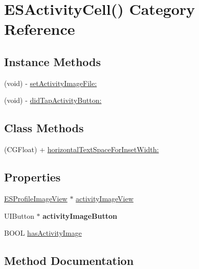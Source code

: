 \hypertarget{category_e_s_activity_cell_07_08}{}\section{E\+S\+Activity\+Cell() Category Reference}
\label{category_e_s_activity_cell_07_08}
\subsection*{Instance Methods}
\begin{DoxyCompactItemize}
\item 
(void) -\/ \hyperlink{category_e_s_activity_cell_07_08_a9d821c59ae22ed2b1169df73f4623a1c}{set\+Activity\+Image\+File\+:}
\item 
(void) -\/ \hyperlink{category_e_s_activity_cell_07_08_ae04968926ffa013fb910647318fad0e9}{did\+Tap\+Activity\+Button\+:}
\end{DoxyCompactItemize}
\subsection*{Class Methods}
\begin{DoxyCompactItemize}
\item 
(C\+G\+Float) + \hyperlink{category_e_s_activity_cell_07_08_a14798b38d97de55b3f61590bf993f941}{horizontal\+Text\+Space\+For\+Inset\+Width\+:}
\end{DoxyCompactItemize}
\subsection*{Properties}
\begin{DoxyCompactItemize}
\item 
\hyperlink{interface_e_s_profile_image_view}{E\+S\+Profile\+Image\+View} $\ast$ \hyperlink{category_e_s_activity_cell_07_08_a946918ea62fd624cf2ca5b4af5393c9e}{activity\+Image\+View}
\item 
\hypertarget{category_e_s_activity_cell_07_08_a2a51bc3a5710f0d5d7c2afd6ed06c631}{}U\+I\+Button $\ast$ {\bfseries activity\+Image\+Button}\label{category_e_s_activity_cell_07_08_a2a51bc3a5710f0d5d7c2afd6ed06c631}

\item 
B\+O\+O\+L \hyperlink{category_e_s_activity_cell_07_08_a977d8948d227016e3beeed5757dfb351}{has\+Activity\+Image}
\end{DoxyCompactItemize}


\subsection{Method Documentation}
\hypertarget{category_e_s_activity_cell_07_08_ae04968926ffa013fb910647318fad0e9}{}
